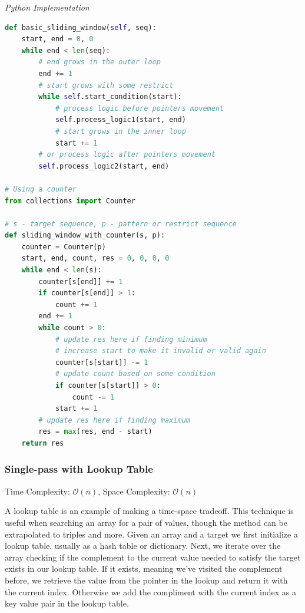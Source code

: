 \documentclass{article}
\newcommand{\bigO}{\mathcal{O}}
\begin{document}
\vspace{8pt} \emph{Python Implementation}
\begin{lstlisting}[language=Python]
def basic_sliding_window(self, seq):
    start, end = 0, 0
    while end < len(seq):
        # end grows in the outer loop
        end += 1
        # start grows with some restrict
        while self.start_condition(start):
            # process logic before pointers movement
            self.process_logic1(start, end)
            # start grows in the inner loop
            start += 1
        # or process logic after pointers movement
        self.process_logic2(start, end)

# Using a counter
from collections import Counter

# s - target sequence, p - pattern or restrict sequence
def sliding_window_with_counter(s, p):
    counter = Counter(p)
    start, end, count, res = 0, 0, 0, 0
    while end < len(s):
        counter[s[end]] += 1
        if counter[s[end]] > 1:
            count += 1
        end += 1
        while count > 0:
            # update res here if finding minimum
            # increase start to make it invalid or valid again
            counter[s[start]] -= 1
            # update count based on some condition
            if counter[s[start]] > 0:
                count -= 1
            start += 1
        # update res here if finding maximum
        res = max(res, end - start)
    return res
\end{lstlisting}

    \subsubsection{Single-pass with Lookup Table}
    Time Complexity: $\bigO(n)$, Space Complexity: $\bigO(n)$
    
    A lookup table is an example of making a time-space tradeoff. This technique is useful when searching an array for a pair of values, though the method can be extrapolated to triples and more. Given an array and a target we first initialize a lookup table, usually as a hash table or dictionary. Next, we iterate over the array checking if the complement to the current value needed to satisfy the target exists in our lookup table. If it exists, meaning we've visited the complement before, we retrieve the value from the pointer in the lookup and return it with the current index. Otherwise we add the compliment with the current index as a key value pair in the lookup table.
\end{document}

